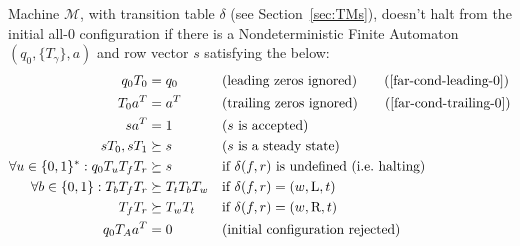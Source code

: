 \begin{theorem}
    \label{far-main-theorem}
    Machine $\mathcal{M}$, with transition table $\delta$ (see Section~\ref{sec:TMs}), doesn't halt from the initial all-0 configuration if there is a Nondeterministic Finite Automaton $(q_0, \{T_\gamma\}, a)$ and row vector $s$ satisfying the below:
    \begin{align}
        \label{far-cond-first}
        q_0 T_0                                & = q_0
                                               &                     & \text{(leading zeros ignored)}
        \tag{\ref{far-cond-leading-0}}
        \\
        T_0a\T                                 & = a\T
                                               &                     & \text{(trailing zeros ignored)}
        \tag{\ref{far-cond-trailing-0}}
        \\
        sa\T                                   & = 1
                                               &                     & \text{($s$ is accepted)}
        \label{far-cond-ass-accepted}
        \\
        sT_0,sT_1                              & \succeq s
                                               &                     & \text{($s$ is a steady state)}
        \label{far-cond-ass-steady}
        \\
        \forall u\in\{0, 1\}^*: q_0T_u T_f T_r & \succeq s
                                               &                     & \text{if $\delta(f,r)$ is undefined (\ie halting)}
        \label{far-cond-halt}
        \\
        \forall b\in\{0, 1\}: T_b T_f T_r      & \succeq T_t T_b T_w
                                               &                     & \text{if $\delta(f,r) = (w,\text{L},t)$}
        \label{far-cond-left}
        \\
        T_f T_r                                & \succeq T_w T_t
                                               &                     & \text{if $\delta(f,r) = (w,\text{R},t)$}
        \label{far-cond-last}
        \\
        q_0 T_A a\T                            & = 0
                                               &                     & \text{(initial configuration rejected)}
        \label{far-cond-reject-start}
    \end{align}
\end{theorem}
